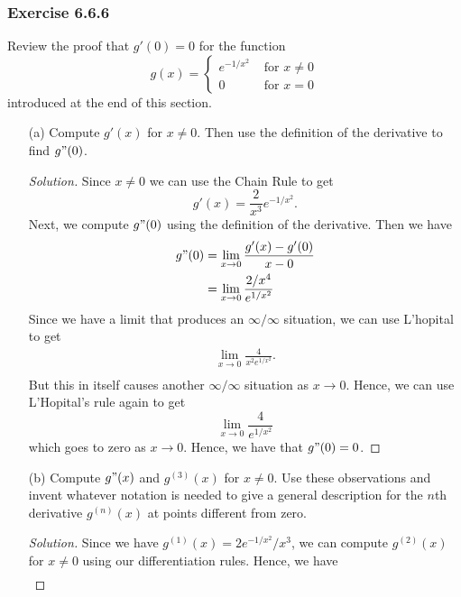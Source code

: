 \subsubsection{Exercise 6.6.6} Review the proof that \( g'(0) = 0 \) for the function 
\[  g(x) = 
\begin{cases}
     e^{-1/x^2} &\text{ for } x \neq 0 \\
    0 &\text{ for } x = 0
\end{cases} \]
introduced at the end of this section.
\begin{enumerate}
    \item[(a)] Compute \( g'(x)  \) for \( x \neq 0  \). Then use the definition of the derivative to find \( g"(0) \).
        \begin{proof}[Solution]
        Since \( x \neq 0  \) we can use the Chain Rule to get 
        \[  g'(x) = \frac{ 2 }{ x^3  } e^{-1/x^2 }.\] Next, we compute \( g"(0)  \) using the definition of the derivative. Then we have 
        \begin{align*}
            g"(0) &= \lim_{ x \to 0  } \frac{ g'(x) - g'(0)  }{ x - 0  }  \\
                  &= \lim_{ x \to 0 }  \frac{ 2 / x^{4 } }{  e^{1 / x^{2}} } \\
        \end{align*}
        Since we have a limit that produces an \( \infty / \infty  \) situation, we can use L'hopital to get 
        \begin{align*}
            \lim_{ x \to 0  } \frac{ 4 }{ x^2 e^{1/x^{2}} } .  \\
        \end{align*}
        But this in itself causes another \( \infty / \infty  \) situation as \( x \to 0 \). Hence, we can use L'Hopital's rule again to get 
        \[  \lim_{ x \to 0 }  \frac{ 4 }{ e^{1/x^2 } } \]
        which goes to zero as \( x \to 0  \). Hence, we have that \( g"(0) = 0  \).
        \end{proof}
    \item[(b)] Compute \( g"(x)  \) and \( g^{(3)}(x)  \) for \( x \neq 0  \). Use these observations and invent whatever notation is needed to give a general description for the \( n \)th derivative \( g^{(n)}(x)  \) at points different from zero.
        \begin{proof}[Solution]
        Since we have \( g^{(1)}(x) = 2 e^{-1 /x^2 } / x^{3} \), we can compute \( g^{(2)}(x)  \) for \( x \neq 0  \) using our differentiation rules. Hence, we have
        \begin{align*}

\end{align*}
\end{proof}
\end{enumerate}
